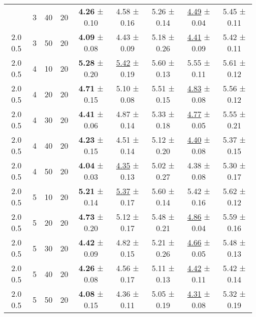 \begin{tabular}{ccccccccc}
\begin{tabular}{lllllllll}
2.0 0.5 & 3 & 40 & 20 & \textbf{4.26} ± 0.10 &             4.58 ± 0.16 & 5.26 ± 0.14 & \underline{4.49} ± 0.04 & 5.45 ± 0.11 \\
2.0 0.5 & 3 & 50 & 20 & \textbf{4.09} ± 0.08 &             4.43 ± 0.09 & 5.18 ± 0.26 & \underline{4.41} ± 0.09 & 5.42 ± 0.11 \\
2.0 0.5 & 4 & 10 & 20 & \textbf{5.28} ± 0.20 & \underline{5.42} ± 0.19 & 5.60 ± 0.13 &             5.55 ± 0.11 & 5.61 ± 0.12 \\
2.0 0.5 & 4 & 20 & 20 & \textbf{4.71} ± 0.15 &             5.10 ± 0.08 & 5.51 ± 0.15 & \underline{4.83} ± 0.08 & 5.56 ± 0.12 \\
2.0 0.5 & 4 & 30 & 20 & \textbf{4.41} ± 0.06 &             4.87 ± 0.14 & 5.33 ± 0.18 & \underline{4.77} ± 0.05 & 5.55 ± 0.21 \\
2.0 0.5 & 4 & 40 & 20 & \textbf{4.23} ± 0.15 &             4.51 ± 0.14 & 5.12 ± 0.20 & \underline{4.40} ± 0.08 & 5.37 ± 0.15 \\
2.0 0.5 & 4 & 50 & 20 & \textbf{4.04} ± 0.03 & \underline{4.35} ± 0.13 & 5.02 ± 0.27 &             4.38 ± 0.08 & 5.30 ± 0.17 \\
2.0 0.5 & 5 & 10 & 20 & \textbf{5.21} ± 0.14 & \underline{5.37} ± 0.17 & 5.60 ± 0.14 &             5.42 ± 0.16 & 5.62 ± 0.12 \\
2.0 0.5 & 5 & 20 & 20 & \textbf{4.73} ± 0.20 &             5.12 ± 0.17 & 5.48 ± 0.21 & \underline{4.86} ± 0.04 & 5.59 ± 0.16 \\
2.0 0.5 & 5 & 30 & 20 & \textbf{4.42} ± 0.09 &             4.82 ± 0.15 & 5.21 ± 0.26 & \underline{4.66} ± 0.05 & 5.48 ± 0.13 \\
2.0 0.5 & 5 & 40 & 20 & \textbf{4.26} ± 0.08 &             4.56 ± 0.17 & 5.11 ± 0.13 & \underline{4.42} ± 0.11 & 5.42 ± 0.14 \\
2.0 0.5 & 5 & 50 & 20 & \textbf{4.08} ± 0.15 &             4.36 ± 0.11 & 5.05 ± 0.19 & \underline{4.31} ± 0.08 & 5.32 ± 0.19 \\
\bottomrule
\end{tabular}
